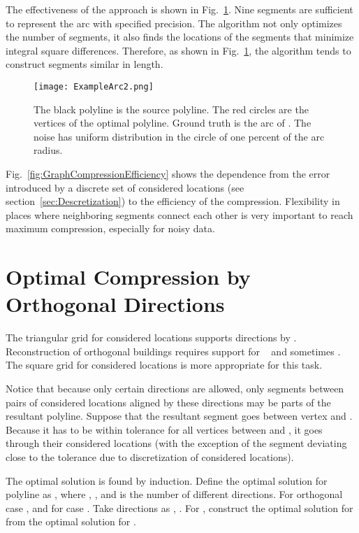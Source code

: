 \documentclass[conference]{IEEEtran}
\begin{document}
The effectiveness of the approach is shown in Fig.~\ref{fig:ExampleArc}. Nine segments are sufficient to represent the arc with specified precision. The algorithm not only optimizes the number of segments, it also finds the locations of the segments that minimize integral square differences. Therefore, as shown in Fig.~\ref{fig:ExampleArc}, the algorithm tends to construct segments similar in length.

\begin{figure} [t]
  \centering
\texttt{[image: ExampleArc2.png]}
  \caption
  {
    The black polyline is the source polyline. The red circles are the vertices of the optimal polyline. Ground truth is the arc of . The noise has uniform distribution in the circle of one percent of the arc radius.
  }
  \label{fig:ExampleArc}
\end{figure}

Fig.~\ref{fig:GraphCompressionEfficiency} shows the dependence from the error introduced by a discrete set of considered locations (see section~\ref{sec:Descretization}) to the efficiency of the compression. Flexibility in places where neighboring segments connect each other is very important to reach maximum compression, especially for noisy data.

\section{Optimal Compression by Orthogonal Directions}

The triangular grid for considered locations supports directions by . Reconstruction of orthogonal buildings requires support for ~\cite{ReconstructionOfOrthogonalPolygonalLines} and sometimes . The square grid for considered locations is more appropriate for this task.

Notice that because only certain directions are allowed, only segments between pairs of considered locations aligned by these directions may be parts of the resultant polyline. Suppose that the resultant segment goes between vertex  and . Because it has to be within tolerance for all vertices between  and , it goes through their considered locations (with the exception of the segment deviating close to the tolerance due to discretization of considered locations).

The optimal solution is found by induction. Define the optimal solution for polyline  as
,
where
,
,
and
 is the number of different directions. For orthogonal case , and for  case . Take directions as , .
For , construct the optimal solution for  from the optimal solution for .
\end{document}
